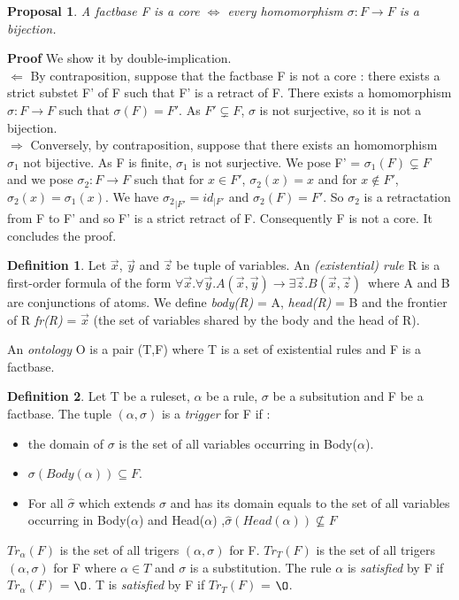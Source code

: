 \documentclass{article}
\theoremstyle{proposal}
\newtheorem{proposal}{Proposal}[section]
\theoremstyle{definition}
\newtheorem{definition}{Definition}[section]
\theoremstyle{theorem}
\begin{document}


\begin{proposal}
A factbase F is a core $\Leftrightarrow$ every homomorphism $\sigma: F \to F$ is a bijection.
\end{proposal}

\noindent \textbf{Proof} We show it by double-implication. \\
$\boxed{\Leftarrow}$ By contraposition, suppose that the factbase F is not a core : there exists a strict substet F' of F such that F' is a retract of F. There exists a homomorphism $\sigma:F \to F$ such that $\sigma(F) = F'$. As $F' \subsetneq F$, $\sigma$ is not surjective, so it is not a bijection. \\
$\boxed{\Rightarrow}$ Conversely, by contraposition, suppose that there exists an homomorphism $\sigma_1$ not bijective. As F is finite, $\sigma_1$ is not surjective. We pose F' = $\sigma_1(F)\subsetneq F$ and we pose $\sigma_2:F \to F$ such that for $x \in F'$, $\sigma_2(x) = x$ and for $x \notin F'$, $\sigma_2(x) = \sigma_1(x)$. We have ${\sigma_2}_{|F'} = id_{|F'}$ and $\sigma_2(F) = F'$. So $\sigma_2$ is a retractation from F to F' and so F' is a strict retract of F. Consequently F is not a core. It concludes the proof.



\begin{definition}
Let $\vec x$, $\vec y$ and $\vec z$ be tuple of variables. An \emph{(existential) rule} R is a first-order formula	 of the form  $\forall \vec x.\forall \vec y. A(\vec x,\vec y) \rightarrow \exists \vec z. B(\vec x,\vec z)$\ where  A and B are conjunctions of atoms. We define \emph{body(R)} = A, \emph{head(R)} = B and the frontier of R \emph{fr(R)} = $\vec x$ (the set of variables shared by the body and the head of R). 

An \emph{ontology} O is a pair (T,F) where T is a set of existential rules and F is a factbase.
\end{definition}

\begin{definition}
Let T be a ruleset, $\alpha$ be a rule, $\sigma$ be a subsitution and F be a factbase. The tuple $(\alpha,\sigma)$ is a \emph{trigger} for F if : 
\begin{itemize}
\item the domain of $\sigma$ is the set of all variables occurring in Body($\alpha$).
\item $\sigma(Body(\alpha)) \subseteq F$.
\item For all $\hat \sigma$ which extends $\sigma$ and has its domain equals to the set of all variables occurring in Body($\alpha$) and Head($\alpha$) ,$\hat \sigma(Head(\alpha)) \nsubseteq F$
\end{itemize}
\emph{$Tr_{\alpha}(F)$} is the set of all trigers $(\alpha,\sigma)$ for F. \emph{$Tr_{T}(F)$} is the set of all trigers $(\alpha,\sigma)$ for F where $\alpha \in T$ and $\sigma$ is a substitution. The rule $\alpha$ is \emph{satisfied} by F if $Tr_{\alpha}(F)$ = $\O$. T is \emph{satisfied} by F if $Tr_{T}(F)$ = $\O$.
\end{definition}
\end{document}
